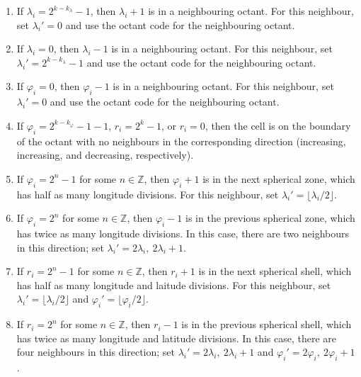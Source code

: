 \begin{enumerate}
	\item If $\lambda_i = 2^{k - k_\lambda} - 1$, then $\lambda_i + 1$ is in a neighbouring octant.
	For this neighbour, set $\lambda_i' = 0$ and use the octant code for the neighbouring octant.
	\item If $\lambda_i = 0$, then $\lambda_i - 1$ is in a neighbouring octant.
	For this neighbour, set $\lambda_i' = 2^{k - k_\lambda} - 1$ and use the octant code for the neighbouring octant.
	\item If $\varphi_i = 0$, then $\varphi_i - 1$ is in a neighbouring octant.
	For this neighbour, set $\lambda_i' = 0$ and use the octant code for the neighbouring octant.
	\item If $\varphi_i = 2^{k - k_\varphi} - 1 - 1$, $r_i = 2^k - 1$, or $r_i = 0$, then the cell is on the boundary of the octant with no neighbours in the corresponding direction (increasing, increasing, and decreasing, respectively).
	\item If $\varphi_i = 2^n - 1$ for some $n \in \mathbb{Z}$, then $\varphi_i + 1$ is in the next spherical zone, which has half as many longitude divisions.
	For this neighbour, set $\lambda_i' = \lfloor \lambda_i / 2 \rfloor$.
	\item If $\varphi_i = 2^n$ for some $n \in \mathbb{Z}$, then $\varphi_i - 1$ is in the previous spherical zone, which has twice as many longitude divisions.
	In this case, there are two neighbours in this direction; set $\lambda_i' = 2 \lambda_i, \  2 \lambda_i + 1$.
	\item If $r_i = 2^n - 1$ for some $n \in \mathbb{Z}$, then $r_i + 1$ is in the next spherical shell, which has half as many longitude and laitude divisions.
	For this neighbour, set $\lambda_i' = \lfloor \lambda_i / 2 \rfloor$ and $\varphi_i' = \lfloor \varphi_i / 2 \rfloor$.
	\item If $r_i = 2^n$ for some $n \in \mathbb{Z}$, then $r_i - 1$ is in the previous spherical shell, which has twice as many longitude and latitude divisions.
	In this case, there are four neighbours in this direction; set $\lambda_i' = 2 \lambda_i, \  2 \lambda_i + 1$ and $\varphi_i' = 2 \varphi_i, \  2 \varphi_i + 1$.
\end{enumerate}
%


